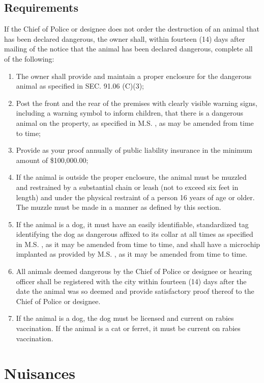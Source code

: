 \subsection{Requirements}
If the Chief of Police or designee does not order the destruction of an animal that has been declared dangerous, the owner shall, within fourteen (14) days after mailing of the notice that the animal has been declared dangerous, complete all of the following:
\begin{enumerate}[{\indent}1)]
    \item The owner shall provide and maintain a proper enclosure for the dangerous animal as specified in SEC. 91.06 (C)(3);
    \item Post the front and the rear of the premises with clearly visible warning signs, including a warning symbol to inform children, that there is a dangerous animal on the property, as specified in M.S. , as may be amended from time to time;
    \item Provide as your proof annually of public liability insurance in the minimum amount of \$100,000.00;
    \item If the animal is outside the proper enclosure, the animal must be muzzled and restrained by a substantial chain or leash (not to exceed six feet in length) and under the physical restraint of a person 16 years of age or older.  The muzzle must be made in a manner as defined by this section.
    \item If the animal is a dog, it must have an easily identifiable, standardized tag identifying the dog as dangerous affixed to its collar at all times as specified in M.S. , as it may be amended from time to time, and shall have a microchip implanted as provided by M.S. , as it may be amended from time to time.
    \item All animals deemed dangerous by the Chief of Police or designee or hearing officer shall be registered with the city within fourteen (14) days after the date the animal was so deemed and provide satisfactory proof thereof to the Chief of Police or designee.
    \item If the animal is a dog, the dog must be licensed and current on rabies vaccination.  If the animal is a cat or ferret, it must be current on rabies vaccination.
\end{enumerate}

\section{Nuisances}
